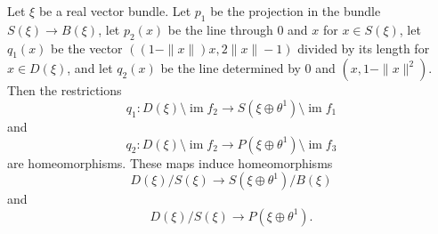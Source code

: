 Let $\xi$ be a real vector bundle. Let $p_1$ be the projection in the bundle $S(\xi) \rightarrow B(\xi)$, let $p_2(x)$ be the line through $0$ and $x$ for $x \in S(\xi)$, let $q_1(x)$ be the vector $((1 - \|x\|)x, 2\|x\| - 1)$ divided by its length for $x \in D(\xi)$, and let $q_2(x)$ be the line determined by $0$ and $(x, 1 - \|x\|^2)$. Then the restrictions
$$q_1: D(\xi) \setminus \operatorname{im} f_2 \rightarrow S(\xi \oplus \theta^1) \setminus \operatorname{im} f_1$$
and
$$q_2: D(\xi) \setminus \operatorname{im} f_2 \rightarrow P(\xi \oplus \theta^1) \setminus \operatorname{im} f_3$$
are homeomorphisms. These maps induce homeomorphisms
$$D(\xi)/S(\xi) \rightarrow S(\xi \oplus \theta^1)/B(\xi)$$
and
$$D(\xi)/S(\xi) \rightarrow P(\xi \oplus \theta^1).$$
